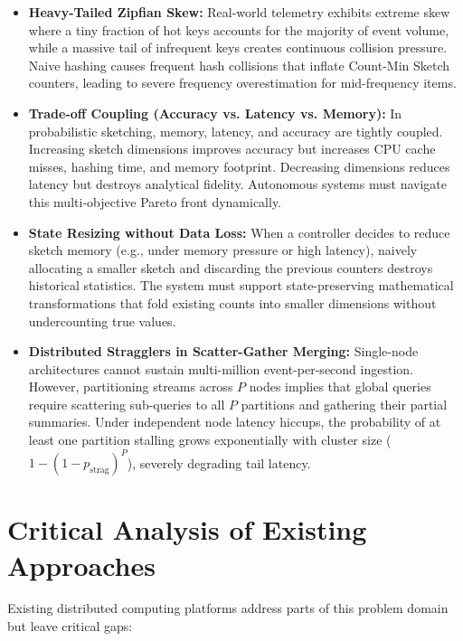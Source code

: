 \begin{itemize}
 \item \textbf{Heavy-Tailed Zipfian Skew:} Real-world telemetry exhibits extreme skew where a tiny fraction of hot keys accounts for the majority of event volume, while a massive tail of infrequent keys creates continuous collision pressure. Naive hashing causes frequent hash collisions that inflate Count-Min Sketch counters, leading to severe frequency overestimation for mid-frequency items.
 
 \item \textbf{Trade-off Coupling (Accuracy vs. Latency vs. Memory):} In probabilistic sketching, memory, latency, and accuracy are tightly coupled. Increasing sketch dimensions improves accuracy but increases CPU cache misses, hashing time, and memory footprint. Decreasing dimensions reduces latency but destroys analytical fidelity. Autonomous systems must navigate this multi-objective Pareto front dynamically.

 \item \textbf{State Resizing without Data Loss:} When a controller decides to reduce sketch memory (e.g., under memory pressure or high latency), naively allocating a smaller sketch and discarding the previous counters destroys historical statistics. The system must support state-preserving mathematical transformations that fold existing counts into smaller dimensions without undercounting true values.

 \item \textbf{Distributed Stragglers in Scatter-Gather Merging:} Single-node architectures cannot sustain multi-million event-per-second ingestion. However, partitioning streams across $P$ nodes implies that global queries require scattering sub-queries to all $P$ partitions and gathering their partial summaries. Under independent node latency hiccups, the probability of at least one partition stalling grows exponentially with cluster size ($1 - (1 - p_{\text{strag}})^P$), severely degrading tail latency.
\end{itemize}

\section{Critical Analysis of Existing Approaches}

Existing distributed computing platforms address parts of this problem domain but leave critical gaps:

